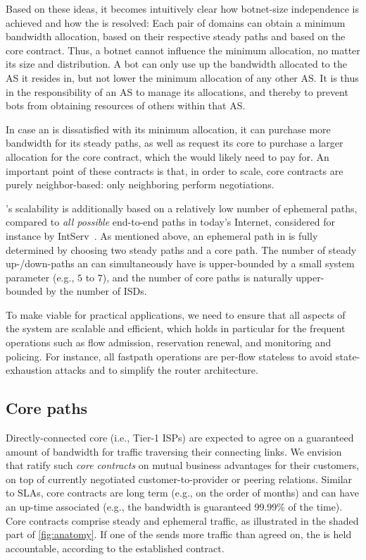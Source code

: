 Based on these ideas, it becomes intuitively clear how botnet-size independence
is achieved and how the \tragedy is resolved: Each pair of domains can obtain a
minimum bandwidth allocation, based on their respective steady paths and based
on the core contract. Thus, a botnet cannot influence the minimum allocation,
no matter its size and distribution. A bot can only use up the bandwidth
allocated to the AS it resides in, but not lower the minimum allocation of any
other AS. It is thus in the responsibility of an AS to manage its allocations,
and thereby to prevent bots from obtaining resources of others within that AS.

In case an \AD is dissatisfied with its minimum allocation, it can purchase
more bandwidth for its steady paths, as well as request its core \AD to
purchase a larger allocation for the core contract, which the \AD would likely
need to pay for. An important point of these contracts is that, in order to
scale, core contracts are purely neighbor-based: only neighboring \ADs perform
negotiations.

\name's scalability is additionally based on a relatively low number of
ephemeral paths, compared to \emph{all possible} end-to-end paths in today's
Internet, considered for instance by IntServ~\cite{intserv}. As mentioned
above, an ephemeral path in \name is fully determined by choosing two steady
paths and a core path. The number of steady up-/down-paths an \AD can
simultaneously have is upper-bounded by a small \name system parameter (e.g.,
$5$ to $7$), and the number of core paths is naturally upper-bounded by the
number of ISDs.

To make \name viable for practical applications, we need to ensure that all
aspects of the system are scalable and efficient, which holds in particular for
the frequent operations such as flow admission, reservation renewal, and
monitoring and policing.
For instance, all fastpath operations are per-flow stateless to avoid
state-exhaustion attacks and to simplify the router architecture.


\subsection{Core paths}
\label{sec:corepaths}

\noindent
Directly-connected core \ADs (i.e., Tier-1 ISPs) are expected to agree on a
guaranteed amount of bandwidth for traffic traversing their connecting links.
We envision that \ADs ratify such \emph{core contracts} on mutual business
advantages for their customers, on top of currently negotiated
customer-to-provider or peering relations. Similar to SLAs, core contracts are
long term (e.g., on the order of months) and can have an up-time associated
(e.g., the bandwidth is guaranteed 99.99\% of the time). Core contracts
comprise steady and ephemeral traffic, as illustrated in the shaded part of
\autoref{fig:anatomy}.
If one of the \ADs sends more traffic than agreed on, the \AD is held
accountable, according to the established contract.

